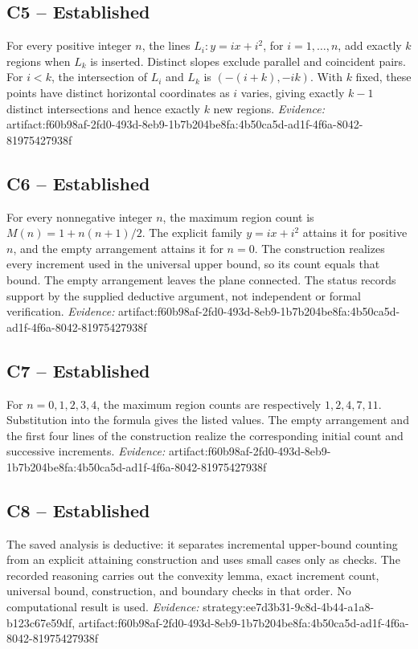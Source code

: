 \documentclass[11pt]{article}
\begin{document}
\subsection{C5 -- Established}
For every positive integer $n$, the lines $L_i: y=ix+i^2$, for $i=1,\ldots,n$, add exactly $k$ regions when $L_k$ is inserted.
Distinct slopes exclude parallel and coincident pairs. For $i<k$, the intersection of $L_i$ and $L_k$ is $(-(i+k),-ik)$. With $k$ fixed, these points have distinct horizontal coordinates as $i$ varies, giving exactly $k-1$ distinct intersections and hence exactly $k$ new regions.
\textit{Evidence: }artifact:f60b98af-2fd0-493d-8eb9-1b7b204be8fa:4b50ca5d-ad1f-4f6a-8042-81975427938f
\subsection{C6 -- Established}
For every nonnegative integer $n$, the maximum region count is $M(n)=1+n(n+1)/2$. The explicit family $y=ix+i^2$ attains it for positive $n$, and the empty arrangement attains it for $n=0$.
The construction realizes every increment used in the universal upper bound, so its count equals that bound. The empty arrangement leaves the plane connected. The status records support by the supplied deductive argument, not independent or formal verification.
\textit{Evidence: }artifact:f60b98af-2fd0-493d-8eb9-1b7b204be8fa:4b50ca5d-ad1f-4f6a-8042-81975427938f
\subsection{C7 -- Established}
For $n=0,1,2,3,4$, the maximum region counts are respectively $1,2,4,7,11$.
Substitution into the formula gives the listed values. The empty arrangement and the first four lines of the construction realize the corresponding initial count and successive increments.
\textit{Evidence: }artifact:f60b98af-2fd0-493d-8eb9-1b7b204be8fa:4b50ca5d-ad1f-4f6a-8042-81975427938f
\subsection{C8 -- Established}
The saved analysis is deductive: it separates incremental upper-bound counting from an explicit attaining construction and uses small cases only as checks.
The recorded reasoning carries out the convexity lemma, exact increment count, universal bound, construction, and boundary checks in that order. No computational result is used.
\textit{Evidence: }strategy:ee7d3b31-9c8d-4b44-a1a8-b123c67e59df, artifact:f60b98af-2fd0-493d-8eb9-1b7b204be8fa:4b50ca5d-ad1f-4f6a-8042-81975427938f
\end{document}
